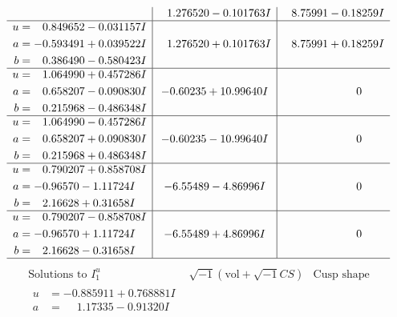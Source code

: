\documentclass[1p]{elsarticle_modified}
\theoremstyle{definition}
\newcommand{\I}{\sqrt{-1}}
\begin{document}
$$\begin{array}{c|c|c}
 & \phantom{-}1.276520 - 0.101763 I & \phantom{-}8.75991 - 0.18259 I \\ \hline\begin{aligned}
u &= \phantom{-}0.849652 - 0.031157 I \\
a &= -0.593491 + 0.039522 I \\
b &= \phantom{-}0.386490 - 0.580423 I\end{aligned}
 & \phantom{-}1.276520 + 0.101763 I & \phantom{-}8.75991 + 0.18259 I \\ \hline\begin{aligned}
u &= \phantom{-}1.064990 + 0.457286 I \\
a &= \phantom{-}0.658207 - 0.090830 I \\
b &= \phantom{-}0.215968 - 0.486348 I\end{aligned}
 & -0.60235 + 10.99640 I & \phantom{-0.000000 } 0 \\ \hline\begin{aligned}
u &= \phantom{-}1.064990 - 0.457286 I \\
a &= \phantom{-}0.658207 + 0.090830 I \\
b &= \phantom{-}0.215968 + 0.486348 I\end{aligned}
 & -0.60235 - 10.99640 I & \phantom{-0.000000 } 0 \\ \hline\begin{aligned}
u &= \phantom{-}0.790207 + 0.858708 I \\
a &= -0.96570 - 1.11724 I \\
b &= \phantom{-}2.16628 + 0.31658 I\end{aligned}
 & -6.55489 - 4.86996 I & \phantom{-0.000000 } 0 \\ \hline\begin{aligned}
u &= \phantom{-}0.790207 - 0.858708 I \\
a &= -0.96570 + 1.11724 I \\
b &= \phantom{-}2.16628 - 0.31658 I\end{aligned}
 & -6.55489 + 4.86996 I & \phantom{-0.000000 } 0\\
 \hline 
 \end{array}$$\newpage$$\begin{array}{c|c|c}  
\text{Solutions to }I^u_{1}& \I (\text{vol} + \sqrt{-1}CS) & \text{Cusp shape}\\
 \hline 
\begin{aligned}
u &= -0.885911 + 0.768881 I \\
a &= \phantom{-}1.17335 - 0.91320 I \\

\end{aligned}
\end{array}$$
\end{document}
